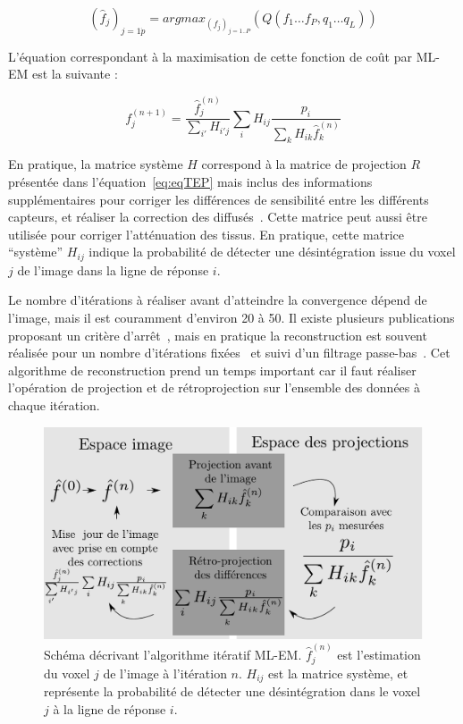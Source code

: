 \[
 (\hat{f}_j)_{j=1\dot p} = argmax_{(f_j)_{j=1..P}} (Q(f_1 \dots f_P, q_1 \dots q_L))
\]

L'équation correspondant à la maximisation de cette fonction de coût par ML-EM est la suivante :

\begin{equation}
	f_j^{(n+1)}=\frac{\hat{f}_j^{(n)}}{\sum\limits_{i'}H_{i'j}}\sum\limits_{i}H_{ij}\frac{p_i}{\sum\limits_{k}H_{ik}\hat{f}_k^{(n)}}
\label{eq:MLEM}
\end{equation}

En pratique, la matrice système $H$ correspond à la matrice de projection $R$ présentée dans l'équation~\ref{eq:eqTEP} mais inclus des informations supplémentaires pour corriger les différences de sensibilité entre les différents capteurs, et réaliser la correction des diffusés~\cite{shepp1982maximum,chornoboy1990evaluation}. Cette matrice peut aussi être utilisée pour corriger l'atténuation des tissus. En pratique, cette matrice ``système'' $H_{ij}$ indique la probabilité de détecter une désintégration issue du voxel $j$ de l'image dans la ligne de réponse $i$.




Le nombre d'itérations à réaliser avant d'atteindre la convergence dépend de l'image, mais il est couramment d'environ 20 à 50. Il existe plusieurs publications proposant un critère d'arrêt~\cite{bissantz2006multi}, mais en pratique la reconstruction est souvent réalisée pour un nombre d'itérations fixées~\cite{bailey2005positon} et  suivi d'un filtrage passe-bas~\cite{daube2001application}. Cet algorithme de reconstruction prend un temps important car il faut réaliser l'opération de projection et de rétroprojection sur l'ensemble des données à chaque itération.

\begin{figure}
\centering
\includegraphics[width=12cm]{images/MLEM}
\caption[Schéma de principe de l'algorithme MLEM]{Schéma décrivant l'algorithme itératif ML-EM. $\hat{f}^{(n)}_j$ est l'estimation du voxel $j$ de l'image à l'itération $n$. $H_{ij}$ est la matrice système, et représente la probabilité de détecter une désintégration dans le voxel $j$ à la ligne de réponse $i$.}
\label{fig:schemaMLEM}
\end{figure}


